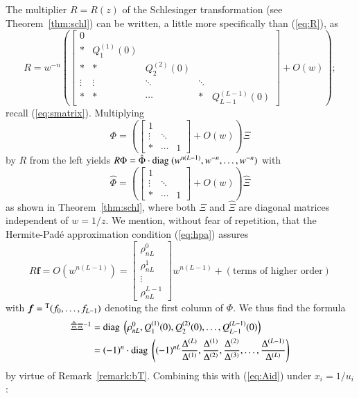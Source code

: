 \documentclass[12pt]{article}
\numberwithin{equation}{section}
\begin{document}
The multiplier $R=R(z)$ of the Schlesinger transformation 
(see Theorem~\ref{thm:schl})
can be written, 
a little more specifically than (\ref{eq:R}),
as 
\[
R
= 
w^{-n}
\left(
\begin{bmatrix}
0 &  & &\\ 
*&Q_1^{(1)}(0)&  & \\ 
*&*&Q_2^{(2)}(0)& \\
\vdots&\vdots&\ddots&\ddots    &\\ 
*&*&\cdots&*&Q_{L-1}^{(L-1)}(0)
\end{bmatrix} 
+O(w)
\right);
\]
recall (\ref{eq:smatrix}).
Multiplying
\[
\Phi
=
\left(
\begin{bmatrix}
1 &  &\\  
 \vdots&\ddots& \\ 
*& \cdots&1
\end{bmatrix}
+O(w)
\right)
\Xi
\]
by $R$ from the left
yields 
$R \Phi = 
\hat{\Phi} 
\cdot {\rm diag \ } 
(w^{n(L-1)}, w^{-n}, \ldots,w^{-n})$
with
\[
\hat{\Phi}
=
\left(
\begin{bmatrix}
1 &  &\\  
 \vdots&\ddots& \\ 
*& \cdots&1
\end{bmatrix}
+O(w)
\right)
\hat{\Xi}
\]
as shown in Theorem~\ref{thm:schl},
where both
$\Xi$ and $\hat{\Xi}$ are diagonal matrices
independent of $w=1/z$.
We mention, 
without fear of repetition,
that
 the Hermite-Pad\'e approximation condition (\ref{eq:hpa})
assures 
\[
R  {\boldsymbol f}=O(w^{n (L-1)})
= 
\begin{bmatrix}
 \rho^0_{nL} 
 \\
  \rho^1_{nL} 
 \\
\vdots     \\
 \rho^{L-1}_{nL} 
 \end{bmatrix}
w^{n(L-1)} + 
(\text{terms of higher order})
\]
with
${\boldsymbol f}={}^{\rm T}(f_0, \ldots,f_{L-1})$
 denoting the first column of $\Phi$.
 We thus find the formula
\begin{align*}
 \hat{\Xi} {\Xi}^{-1}
&= {\rm diag \ } 
\left( \rho^0_{nL} , Q_1^{(1)}(0), Q_2^{(2)}(0),
\ldots,Q_{L-1}^{(L-1)}(0)
\right)
\\
&=
(-1)^n
\cdot
 {\rm diag \ } 
\left( (-1)^{nL} \frac{\Delta^{(L)}}{\Delta^{(1)}}, 
\frac{\Delta^{(1)}}{\Delta^{(2)}}, 
\frac{\Delta^{(2)}}{\Delta^{(3)}}, 
\ldots,
\frac{\Delta^{(L-1)}}{\Delta^{(L)}} 
\right)
\end{align*}
by virtue of Remark~\ref{remark:bT}.
Combining this with (\ref{eq:Aid})
under $x_i=1/u_i$:
\end{document}

